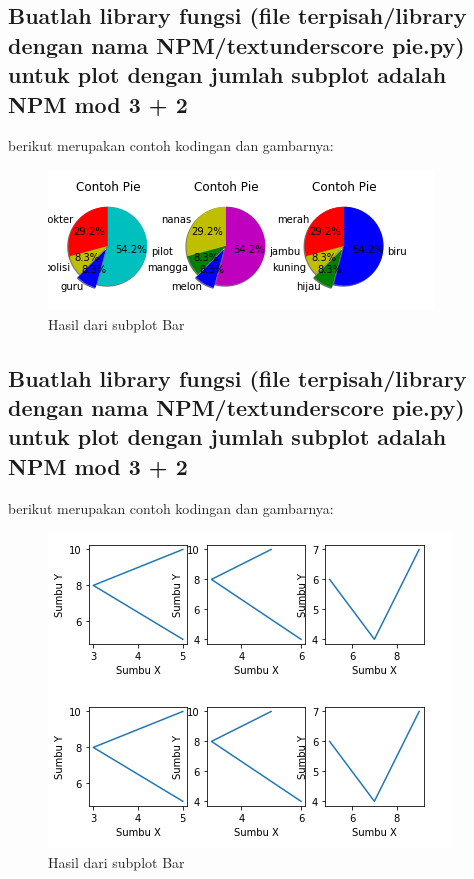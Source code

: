 \subsection{Buatlah library fungsi (file terpisah/library dengan nama NPM/textunderscore pie.py) untuk plot dengan jumlah subplot adalah NPM mod 3 + 2}
berikut merupakan contoh kodingan dan gambarnya:


\begin{figure}[h]
\centering
\includegraphics[scale=0.9]{figures/6/1174086/pie.png}
\caption{Hasil dari subplot Bar}
\label{fig:contoh}
\end{figure}
\subsection{Buatlah library fungsi (file terpisah/library dengan nama NPM/textunderscore pie.py) untuk plot dengan jumlah subplot adalah NPM mod 3 + 2}
berikut merupakan contoh kodingan dan gambarnya:


\begin{figure}[h]
\centering
\includegraphics[scale=0.9]{figures/6/1174086/plot.png}
\caption{Hasil dari subplot Bar}
\end{figure}

